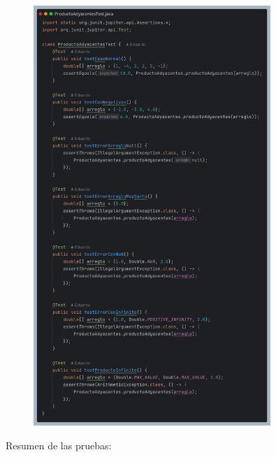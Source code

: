 \documentclass{article}
\begin{document}
\begin{figure}[H]
    \centering
    \includegraphics[width=0.8\textwidth]{imagenes/unittest.png}
\end{figure}
Resumen de las pruebas:
\end{document}
